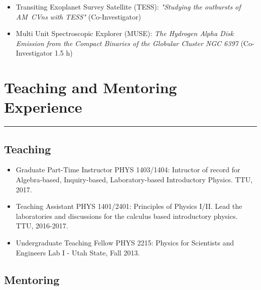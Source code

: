 \documentclass[letterpaper,10pt]{article}
\begin{document}
  

\begin{itemize}[label=$\blacktriangleright$]
      \item   Transiting Exoplanet Survey Satellite (TESS): \emph{"Studying the outbursts of AM~CVns with TESS"} (Co-Investigator)
  \end{itemize}


  \begin{itemize}[label=$\blacktriangleright$]
        \item Multi Unit Spectroscopic Explorer (MUSE): \emph{The Hydrogen Alpha Disk Emission from the Compact Binaries of the Globular Cluster NGC 6397} (Co-Investigator 1.5 h)
  \end{itemize}


\section*{Teaching and Mentoring Experience}

\hrule
\vspace{.3 cm}
\subsection*{Teaching}

\begin{itemize}[label=$\blacktriangleright$]
\item   Graduate Part-Time Instructor PHYS 1403/1404: Intructor of record for Algebra-based, Inquiry-based, Laboratory-based Introductory Physics. TTU, 2017.  
 
 \item   Teaching Assistant  PHYS 1401/2401: Principles of Physics I/II. Lead the laboratories and discussions for the calculus based introductory physics. TTU, 2016-2017.
  

 \item Undergraduate Teaching Fellow  PHYS 2215: Physics for Scientists and Engineers Lab I -  Utah State, Fall 2013.
 
 
 
  \end{itemize}
  
  \subsection*{Mentoring}
\end{document}
